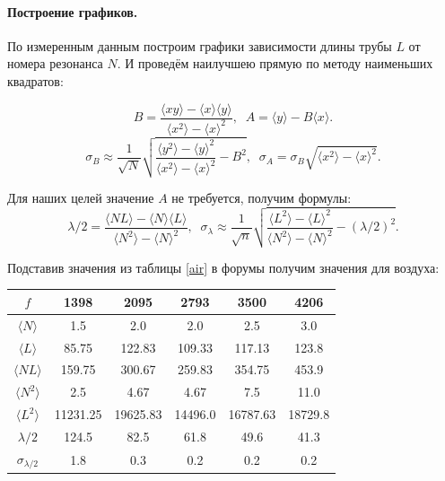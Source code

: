 \documentclass[a4paper,12pt]{article} %
\begin{document}
\paragraph{Построение графиков.}
По измеренным данным построим графики зависимости длины трубы $L$ от номера резонанса $N$. И проведём наилучшею прямую по методу наименьших квадратов:

\begin{equation}
B = \frac{\langle xy \rangle - \langle x \rangle \langle y \rangle}{\langle x^2 \rangle - \langle x \rangle ^ 2}, \;\;
A = \langle y \rangle - B \langle x \rangle . \label{lsf}
\end{equation}
\begin{equation}
\sigma_B \approx \frac{1}{\sqrt{N}}\sqrt{\frac{\langle y^2 \rangle - \langle y \rangle ^ 2}{\langle x^2 \rangle - \langle x \rangle ^ 2} - B^2}, \;\;
\sigma_A = \sigma_B \sqrt{\langle x^2 \rangle - \langle x \rangle ^ 2}. \label{lsfvar}
\end{equation}

Для наших целей значение $A$ не требуется, получим формулы:
\begin{equation}
\lambda/2 = \frac{\langle NL \rangle - \langle N \rangle \langle L \rangle}{\langle N^2 \rangle - \langle N \rangle ^ 2}, \;\;
\sigma_{\lambda} \approx \frac{1}{\sqrt{n}}\sqrt{\frac{\langle L^2 \rangle - \langle L \rangle ^ 2}{\langle N^2 \rangle - \langle N \rangle ^ 2} - \left(\lambda/2\right)^2} . \label{lsf2}
\end{equation}

Подставив значения из таблицы \ref{air} в форумы получим значения для воздуха:


\begin{center}
\begin{tabular}{|c|c|c|c|c|c|}
\hline 
$f$ & 1398 & 2095 & 2793 & 3500 & 4206 \\ 
\hline 
$\langle N \rangle$ & 1.5 & 2.0 & 2.0 & 2.5 & 3.0 \\ 
\hline 
$\langle L \rangle$ & 85.75 & 122.83 & 109.33 & 117.13 & 123.8 \\ 
\hline 
$\langle NL \rangle$ & 159.75 & 300.67 & 259.83 & 354.75 & 453.9 \\ 
\hline 
$\langle N^2 \rangle$ & 2.5 & 4.67 & 4.67 & 7.5 & 11.0 \\ 
\hline 
$\langle L^2 \rangle$ & 11231.25 & 19625.83 & 14496.0 & 16787.63 & 18729.8 \\ 
\hline 
$\lambda/2$ & 124.5 & 82.5 & 61.8 & 49.6 & 41.3 \\ 
\hline 
$\sigma_{\lambda/2}$ & 1.8 & 0.3 & 0.2 & 0.2 & 0.2 \\ 
\hline 
\end{tabular} 
\end{center}
\end{document}
